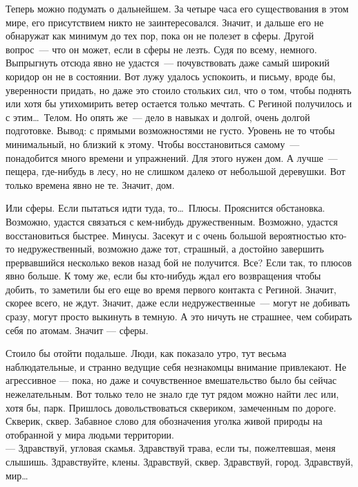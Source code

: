 Теперь можно подумать о дальнейшем. За четыре часа его существования в этом 
мире, его присутствием никто не заинтересовался. Значит, и дальше его не 
обнаружат как минимум до тех пор, пока он не полезет в сферы. Другой вопрос~--- 
что он может, если в сферы не лезть. Судя по всему, немного. Выпрыгнуть отсюда 
явно не удастся~--- почувствовать даже самый широкий коридор он не в состоянии. 
Вот лужу удалось успокоить, и письму, вроде бы, уверенности придать, но даже это 
стоило стольких сил, что о том, чтобы поднять или хотя бы утихомирить ветер 
остается только мечтать. С Региной получилось и с этим\ldots\ Телом. Но опять 
же~--- 
дело в навыках и долгой, очень долгой подготовке. Вывод: с прямыми возможностями 
не густо. Уровень не то чтобы минимальный, но близкий к этому. Чтобы 
восстановиться самому~--- понадобится много времени и упражнений. Для этого 
нужен 
дом. А лучше~--- пещера, где-нибудь в лесу, но не слишком далеко от небольшой 
деревушки. Вот только времена явно не те. Значит, дом.

Или сферы. Если пытаться идти туда, то\ldots\ Плюсы. Прояснится обстановка. 
Возможно, удастся связаться с кем-нибудь дружественным. Возможно, удастся 
восстановиться быстрее. Минусы. Засекут и с очень большой вероятностью кто-то 
недружественный, возможно даже тот, страшный, а достойно завершить прервавшийся 
несколько веков назад бой не получится. Все? Если так, то плюсов явно больше. К 
тому же, если бы кто-нибудь ждал его возвращения чтобы добить, то заметили бы 
его еще во время первого контакта с Региной. Значит, скорее всего, не ждут. 
Значит, даже если недружественные~--- могут не добивать сразу, могут просто 
выкинуть в темную. А это ничуть не страшнее, чем собирать себя по атомам. Значит 
--- сферы.

Стоило бы отойти подальше. Люди, как показало утро, тут весьма наблюдательные, и 
странно ведущие себя незнакомцы внимание привлекают. Не агрессивное --– пока, но 
даже и сочувственное вмешательство было бы сейчас нежелательным. Вот только тело 
не знало где тут рядом можно найти лес или, хотя бы, парк. Пришлось 
довольствоваться сквериком, замеченным по дороге. Скверик, сквер. Забавное слово 
для обозначения уголка живой природы на отобранной у мира людьми территории.\\
--- Здравствуй, угловая скамья. Здравствуй трава, если ты, пожелтевшая, меня 
слышишь. Здравствуйте, клены. Здравствуй, сквер. Здравствуй, город. Здравствуй, 
мир\ldots

